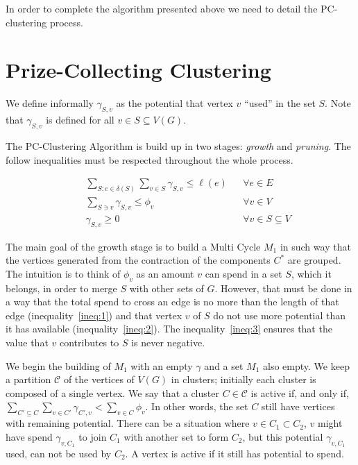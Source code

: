 In order to complete the algorithm presented above we need to detail the PC-clustering process. 

\section{Prize-Collecting Clustering}

We define informally \(\gamma_{S, v}\) as the potential that vertex \(v\) ``used'' in the set \(S\). Note that \(\gamma_{S, v}\) is defined for all \(v \in S \subseteq V(G)\).

The PC-Clustering Algorithm is build up in two stages: \textit{growth} and \textit{pruning}. The follow inequalities must be respected throughout the whole process.

\begin{align}
&&\sum_{S: e \in \delta(S)} \sum_{v \in S} \gamma_{S, v} \leq \ell(e) && \forall e \in E \label{ineq:1} \\
&&\sum_{S \ni v} \gamma_{S, v} \leq \phi_v && \forall v \in V \label{ineq:2} \\
&&\gamma_{S, v} \geq 0 && \forall v \in S \subseteq V \label{ineq:3}
\end{align}

The main goal of the growth stage is to build a Multi Cycle \(M_1\) in such way that the vertices generated from the contraction of the components \(C^\ast\) are grouped. The intuition is to think of \(\phi_v\) as an amount \(v\) can spend in a set \(S\), which it belongs, in order to merge \(S\) with other sets of \(G\). However, that must be done in a way that the total spend to cross an edge is no more than the length of that edge (inequality~\eqref{ineq:1}) and that vertex \(v\) of \(S\) do not use more potential than it has available (inequality~\eqref{ineq:2}). The inequality~\eqref{ineq:3} ensures that the value that \(v\) contributes to \(S\) is never negative.

We begin the building of \(M_1\) with an empty \(\gamma\) and a set \(M_1\) also empty. We keep a partition \(\mathcal{C}\) of the vertices of \(V(G)\) in clusters; initially each cluster is composed of a single vertex. We say that a cluster \(C \in \mathcal{C}\) is active if, and only if, \(\sum_{C' \subseteq C} \sum_{v \in C'} \gamma_{C', v} < \sum_{v \in C} \phi_v\). In other words, the set \(C\) still have vertices with remaining potential. There can be a situation where  \(v \in C_1 \subset C_2\), \(v\) might have spend \(\gamma_{v, C_1}\) to join \(C_1\) with another set to form \(C_2\), but this potential \(\gamma_{v, C_1}\) used, can not be used by \(C_2\). A vertex is active if it still has potential to spend.

